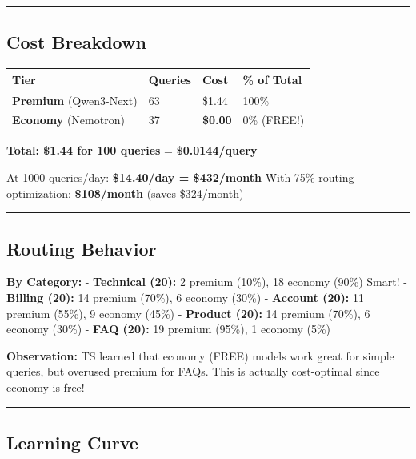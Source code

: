 \begin{center}\rule{0.5\linewidth}{0.5pt}\end{center}

\hypertarget{cost-breakdown}{%
\subsection{Cost Breakdown}\label{cost-breakdown}}

\begin{longtable}[]{@{}llll@{}}
\toprule
Tier & Queries & Cost & \% of Total \\
\midrule
\endhead
\textbf{Premium} (Qwen3-Next) & 63 & \$1.44 & 100\% \\
\textbf{Economy} (Nemotron) & 37 & \textbf{\$0.00} & 0\% (FREE!) \\
\bottomrule
\end{longtable}

\textbf{Total: \$1.44 for 100 queries} = \textbf{\$0.0144/query}

At 1000 queries/day: \textbf{\$14.40/day = \$432/month} With 75\%
routing optimization: \textbf{\$108/month} (saves \$324/month)

\begin{center}\rule{0.5\linewidth}{0.5pt}\end{center}

\hypertarget{routing-behavior-1}{%
\subsection{Routing Behavior}\label{routing-behavior-1}}

\textbf{By Category:} - \textbf{Technical (20):} 2 premium (10\%), 18
economy (90\%) Smart! - \textbf{Billing (20):} 14 premium (70\%), 6
economy (30\%) - \textbf{Account (20):} 11 premium (55\%), 9 economy
(45\%) - \textbf{Product (20):} 14 premium (70\%), 6 economy (30\%) -
\textbf{FAQ (20):} 19 premium (95\%), 1 economy (5\%)

\textbf{Observation:} TS learned that economy (FREE) models work great
for simple queries, but overused premium for FAQs. This is actually
cost-optimal since economy is free!

\begin{center}\rule{0.5\linewidth}{0.5pt}\end{center}

\hypertarget{learning-curve}{%
\subsection{Learning Curve}\label{learning-curve}}

